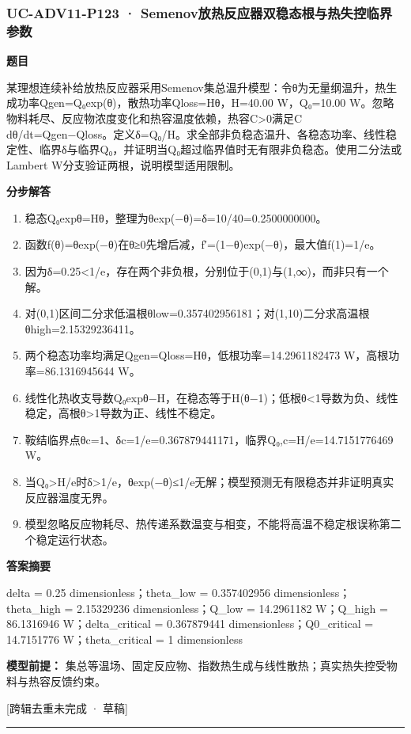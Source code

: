 \documentclass[UTF8,11pt,a4paper]{ctexart}
\begin{document}
\subsubsection*{UC-ADV11-P123 · Semenov放热反应器双稳态根与热失控临界参数}
\noindent\textbf{题目}\par
某理想连续补给放热反应器采用Semenov集总温升模型：令θ为无量纲温升，热生成功率Qgen=Q₀exp(θ)，散热功率Qloss=Hθ，H=40.00 W，Q₀=10.00 W。忽略物料耗尽、反应物浓度变化和热容温度依赖，热容C>0满足C dθ/dt=Qgen−Qloss。定义δ=Q₀/H。求全部非负稳态温升、各稳态功率、线性稳定性、临界δ与临界Q₀，并证明当Q₀超过临界值时无有限非负稳态。使用二分法或Lambert W分支验证两根，说明模型适用限制。\par
\medskip\noindent\textbf{分步解答}
\begin{enumerate}
\item 稳态Q₀expθ=Hθ，整理为θexp(−θ)=δ=10/40=0.2500000000。
\item 函数f(θ)=θexp(−θ)在θ≥0先增后减，f′=(1−θ)exp(−θ)，最大值f(1)=1/e。
\item 因为δ=0.25<1/e，存在两个非负根，分别位于(0,1)与(1,∞)，而非只有一个解。
\item 对(0,1)区间二分求低温根θlow=0.357402956181；对(1,10)二分求高温根θhigh=2.15329236411。
\item 两个稳态功率均满足Qgen=Qloss=Hθ，低根功率=14.2961182473 W，高根功率=86.1316945644 W。
\item 线性化热收支导数Q₀expθ−H，在稳态等于H(θ−1)；低根θ<1导数为负、线性稳定，高根θ>1导数为正、线性不稳定。
\item 鞍结临界点θc=1、δc=1/e=0.367879441171，临界Q₀,c=H/e=14.7151776469 W。
\item 当Q₀>H/e时δ>1/e，θexp(−θ)≤1/e无解；模型预测无有限稳态并非证明真实反应器温度无界。
\item 模型忽略反应物耗尽、热传递系数温变与相变，不能将高温不稳定根误称第二个稳定运行状态。
\end{enumerate}
\noindent\textbf{答案摘要}\par
delta = 0.25 dimensionless；theta\_low = 0.357402956 dimensionless；theta\_high = 2.15329236 dimensionless；Q\_low = 14.2961182 W；Q\_high = 86.1316946 W；delta\_critical = 0.367879441 dimensionless；Q0\_critical = 14.7151776 W；theta\_critical = 1 dimensionless\par
\noindent\textbf{模型前提：}
集总等温场、固定反应物、指数热生成与线性散热；真实热失控受物料与热容反馈约束。\par
\noindent\textcolor{red!65!black}{[跨辑去重未完成 · 草稿]} \par
\medskip\hrule\medskip
{}
\end{document}
